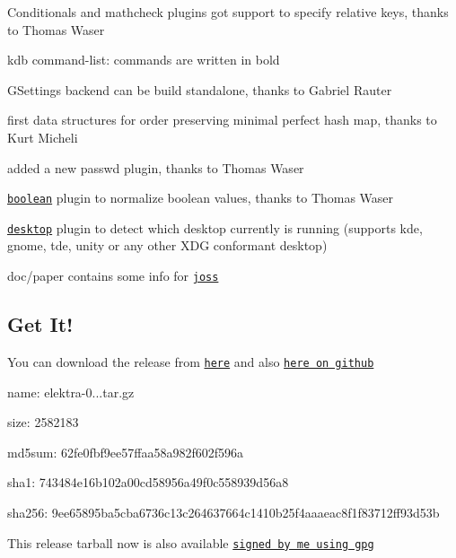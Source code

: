 \begin{DoxyItemize}
\item Conditionals and mathcheck plugins got support to specify relative keys, thanks to Thomas Waser
\item {\ttfamily kdb} command-\/list\+: commands are written in bold
\item G\+Settings backend can be build standalone, thanks to Gabriel Rauter
\item first data structures for order preserving minimal perfect hash map, thanks to Kurt Micheli
\item added a new passwd plugin, thanks to Thomas Waser
\item \href{https://master.libelektra.org/src/plugins/boolean}{\tt boolean} plugin to normalize boolean values, thanks to Thomas Waser
\item \href{https://master.libelektra.org/src/plugins/desktop}{\tt desktop} plugin to detect which desktop currently is running (supports kde, gnome, tde, unity or any other X\+DG conformant desktop)
\item {\ttfamily doc/paper} contains some info for \href{https://github.com/openjournals/joss}{\tt joss}
\end{DoxyItemize}

\subsection*{Get It!}

You can download the release from \href{https://www.libelektra.org/ftp/elektra/releases/elektra-0.8.18.tar.gz}{\tt here} and also \href{https://github.com/ElektraInitiative/ftp/tree/master/releases/elektra-0.8.18.tar.gz}{\tt here on github}


\begin{DoxyItemize}
\item name\+: elektra-\/0...\+tar.\+gz
\item size\+: 2582183
\item md5sum\+: 62fe0fbf9ee57ffaa58a982f602f596a
\item sha1\+: 743484e16b102a00cd58956a49f0c558939d56a8
\item sha256\+: 9ee65895ba5cba6736c13c264637664c1410b25f4aaaeac8f1f83712ff93d53b
\end{DoxyItemize}

This release tarball now is also available \href{https://www.libelektra.org/ftp/elektra/releases/elektra-0.8.18.tar.gz.gpg}{\tt signed by me using gpg}

